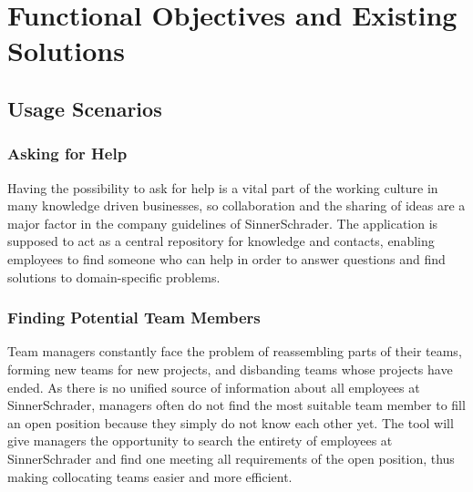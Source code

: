 \chapter{Functional Objectives and Existing Solutions}

\section{Usage Scenarios}
\label{usecases}
\subsection{Asking for Help}
Having the possibility to ask for help is a vital part of the working culture in many knowledge driven
businesses, so collaboration and the sharing of ideas are a major factor in the company guidelines
of SinnerSchrader. The application is supposed to act as a central repository for knowledge and contacts,
enabling employees to find someone who can help in order to answer questions and find solutions to domain-specific problems.

\subsection{Finding Potential Team Members}
Team managers constantly face the problem of reassembling parts of their teams, forming new teams for new projects, and
disbanding teams whose projects have ended. As there is no unified source of information about all employees at SinnerSchrader, managers often
do not find the most suitable team member to fill an open position because they simply do not know each other yet.
The tool will give managers the opportunity to search the entirety of employees at SinnerSchrader and find one
meeting all requirements of the open position, thus making collocating teams easier and more efficient.



